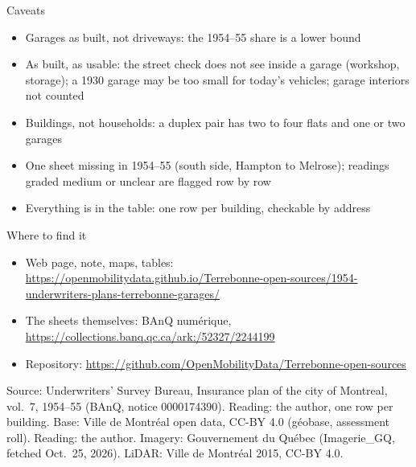 \documentclass[aspectratio=169,11pt]{beamer}
\begin{document}
\begin{frame}{Caveats}\begin{itemize}\item Garages as built, not driveways: the 1954--55 share is a lower bound
\item As built, as usable: the street check does not see inside a garage (workshop, storage); a 1930 garage may be too small for today's vehicles; garage interiors not counted
\item Buildings, not households: a duplex pair has two to four flats and one or two garages
\item One sheet missing in 1954--55 (south side, Hampton to Melrose); readings graded medium or unclear are flagged row by row
\item Everything is in the table: one row per building, checkable by address\end{itemize}\end{frame}
\begin{frame}{Where to find it}\begin{itemize}\item Web page, note, maps, tables: \url{https://openmobilitydata.github.io/Terrebonne-open-sources/1954-underwriters-plans-terrebonne-garages/}
\item The sheets themselves: BAnQ numérique, \url{https://collections.banq.qc.ca/ark:/52327/2244199}
\item Repository: \url{https://github.com/OpenMobilityData/Terrebonne-open-sources}\end{itemize}\vfill{\tiny Source: Underwriters' Survey Bureau, Insurance plan of the city of Montreal, vol.~7, 1954--55 (BAnQ, notice 0000174390). Reading: the author, one row per building. Base: Ville de Montréal open data, CC-BY 4.0 (géobase, assessment roll). Reading: the author. Imagery: Gouvernement du Québec (Imagerie\_GQ, fetched Oct.~25, 2026). LiDAR: Ville de Montréal 2015, CC-BY 4.0.}\end{frame}
\end{document}
